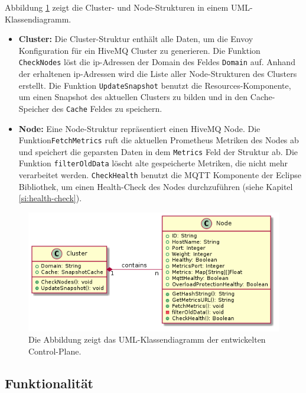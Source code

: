 Abbildung \ref{fig:class-diagram} zeigt die Cluster- und Node-Strukturen in einem UML-Klassendiagramm.
\begin{itemize}
  \item \textbf{Cluster:} Die Cluster-Struktur enthält alle Daten, um die Envoy Konfiguration für ein HiveMQ Cluster zu generieren. Die Funktion \verb|CheckNodes| löst die \ac{ip}-Adressen der Domain des Feldes \verb|Domain| auf. Anhand der erhaltenen \ac{ip}-Adressen wird die Liste aller Node-Strukturen des Clusters erstellt. Die Funktion \verb|UpdateSnapshot| benutzt die Resources-Komponente, um einen Snapshot des aktuellen Clusters zu bilden und in den Cache-Speicher des \verb|Cache| Feldes zu speichern.
  \item \textbf{Node:} Eine Node-Struktur repräsentiert einen HiveMQ Node. Die Funktion\newline \verb|FetchMetrics| ruft die aktuellen Prometheus Metriken des Nodes ab und speichert die geparsten Daten in dem \verb|Metrics| Feld der Struktur ab. Die Funktion \verb|filterOldData| löscht alte gespeicherte Metriken, die nicht mehr verarbeitet werden. \verb|CheckHealth| benutzt die MQTT Komponente der Eclipse Bibliothek, um einen Health-Check des Nodes durchzuführen (siehe Kapitel \ref{si:health-check}).
\end{itemize}

\begin{figure}
    \centering
    \includegraphics[scale=0.6]{gen/class.png}
    \caption{Die Abbildung zeigt das UML-Klassendiagramm der entwickelten Control-Plane.}
    \label{fig:class-diagram}
\end{figure}

\newpage
\subsection{Funktionalität}
